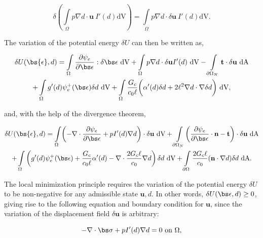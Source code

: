 \begin{equation}\label{dry variation}
    \delta \left( \int\limits_{\Omega} p \nabla d\cdot\textbf{u}\ I'(d)\text{dV} \right) = \int\limits_{\Omega} p \nabla d\cdot\delta\textbf{u}\ I'(d)\text{dV}.
\end{equation}

\noindent The variation of the potential energy $\delta U$ can then be written as,

\begin{multline}
    \delta U(\bs{\epsilon},d) = \int\limits_{\Omega}\dfrac{\partial\psi_e}{\partial \bs \epsilon}:\delta\bs\epsilon\ \text{dV} + \int\limits_{\Omega} p \nabla d\cdot\delta\textbf{u}I'(d)\ \text{dV} 
    - \int\limits_{\partial \Omega_N} \textbf{t}\cdot\delta\textbf{u} \ \text{dA} \\
    + \int\limits_{\Omega}g'(d) \psi_e^+(\bs\epsilon)\delta d\ \text{dV}
    + \int\limits_{\Omega}\dfrac{G_c}{c_0\ell}\bigg( \alpha'(d)\delta d + 2\ell^2\nabla d \cdot \nabla \delta d\bigg)\ \text{dV},
\end{multline}

and, with the help of the divergence theorem, 

\begin{multline}
    \delta U(\bs{\epsilon},d) = \int\limits_{\Omega}\biggl(-\nabla \cdot \dfrac{\partial\psi_e}{\partial \bs \epsilon} + pI'(d) \nabla d\biggr)\cdot\delta\textbf{u}\ \text{dV} 
    + \int\limits_{\partial \Omega_N}\biggl( \dfrac{\partial\psi_e}{\partial \bs \epsilon}\cdot\textbf{n}  -\textbf{t}\biggr)\cdot\delta\textbf{u} \ \text{dA} \\
    + \int\limits_{\Omega}\left(g'(d) \psi_e^+(\bs\epsilon)
    + \dfrac{G_c}{c_0\ell}\alpha'(d) - \nabla \cdot\dfrac{2G_c\ell}{c_0}\nabla d \right)\delta d\ \text{dV} + \int\limits_{\partial\Omega} \dfrac{2G_c\ell}{c_0}(\textbf{n}\cdot\nabla d)  \delta d\ \text{dA}.
\end{multline}

The local minimization principle requires the variation of the potential energy $\delta U$ to be non-negative for any admissible state $\textbf{u},d$. In other words, $\delta U(\bs\epsilon, d) \ge 0$, giving rise to the following equation and boundary condition for $\textbf{u}$, since the variation of the displacement field $\delta \textbf{u}$ is arbitrary:

\begin{equation}\label{disp equation}
    -\nabla \cdot \bs \sigma  + pI'(d) \nabla d = 0 \text{ on }\Omega,
\end{equation}

